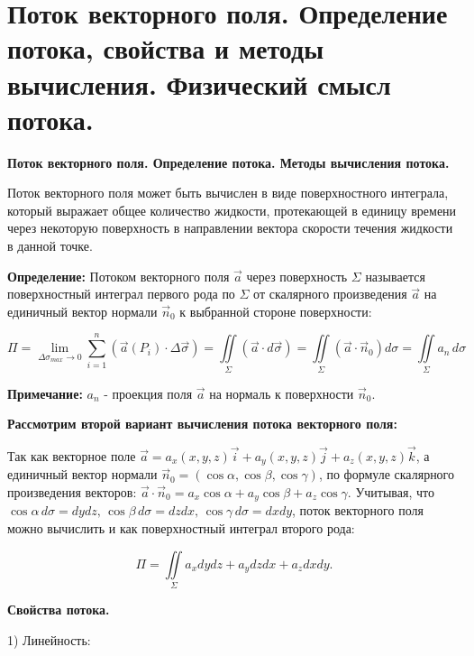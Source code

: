 \section {Поток векторного поля. Определение потока, свойства и методы вычисления. Физический смысл потока.}

\begin{center}
\textbf{Поток векторного поля. Определение потока. Методы вычисления потока.}
\end{center}

Поток векторного поля может быть вычислен в виде поверхностного интеграла, который выражает общее количество жидкости, протекающей в единицу времени через некоторую поверхность в направлении вектора скорости течения жидкости в данной точке. 

\par\bigskip

\textbf{Определение:} Потоком векторного поля  $\vec{a}$ через поверхность $\Sigma$ называется поверхностный интеграл первого рода по $\Sigma$ от скалярного произведения $\vec{a}$ на единичный вектор нормали $\vec{n}_0$ к выбранной стороне поверхности: 

$$\Pi= \lim_{\Delta\sigma_{max}\rightarrow 0} \sum_{i=1}^{n}(\vec{a}(P_i)\cdot\Delta\vec{\sigma}) = \iint\limits_\Sigma(\vec{a}\cdot
d\vec{\sigma})=\iint\limits_\Sigma(\vec{a}\cdot
\vec{n}_0) d\sigma = \iint\limits_\Sigma a_n\, d \sigma$$

\textbf{Примечание:} $a_n$ - проекция поля $\vec{a}$ на нормаль к поверхности $\vec{n}_0$.

\par\bigskip
\textbf{Рассмотрим второй вариант вычисления потока векторного поля:} 

Так как векторное поле $\vec{a}=a_x(x,y,z)\vec{i}+a_y(x,y,z)\vec{j}+a_z(x,y,z)\vec{k}$, а единичный вектор нормали $\vec{n}_0 = (\cos{\alpha}, \cos{\beta}, \cos{\gamma})$,  по формуле скалярного произведения векторов: $\vec{a}\cdot \vec{n}_0 = a_x\cos{\alpha} + a_y\cos{\beta} + a_z\cos{\gamma}$.
Учитывая, что $\cos{\alpha}\, d\sigma = dydz, \, \cos{\beta}\, d\sigma = dzdx, \, \cos{\gamma}\, d\sigma = dxdy$, поток векторного поля можно вычислить и как поверхностный интеграл второго рода:

$$\Pi=\iint\limits_\Sigma a_x dydz + a_y dzdx + a_z dxdy.$$

\begin{center}
	\textbf{Свойства потока.}
\end{center}

1) Линейность:


